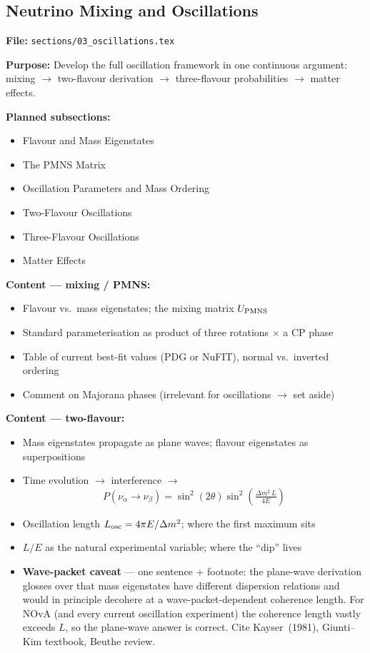 \documentclass[11pt]{article}
\begin{document}
\subsection{Neutrino Mixing and Oscillations}
\label{plan:oscillations}

\textbf{File:} \texttt{sections/03\_oscillations.tex}

\textbf{Purpose:} Develop the full oscillation framework in one continuous argument: mixing
$\to$ two-flavour derivation $\to$ three-flavour probabilities $\to$ matter effects.

\textbf{Planned subsections:}
\begin{itemize}
    \item Flavour and Mass Eigenstates
    \item The PMNS Matrix
    \item Oscillation Parameters and Mass Ordering
    \item Two-Flavour Oscillations
    \item Three-Flavour Oscillations
    \item Matter Effects
\end{itemize}

\textbf{Content --- mixing / PMNS:}
\begin{itemize}
    \item Flavour vs.\ mass eigenstates; the mixing matrix $U_{\rm PMNS}$
    \item Standard parameterisation as product of three rotations $\times$ a CP phase
    \item Table of current best-fit values (PDG or NuFIT), normal vs.\ inverted ordering
    \item Comment on Majorana phases (irrelevant for oscillations $\to$ set aside)
\end{itemize}

\textbf{Content --- two-flavour:}
\begin{itemize}
    \item Mass eigenstates propagate as plane waves; flavour eigenstates as superpositions
    \item Time evolution $\to$ interference $\to$
    \[
        P(\nu_\alpha \to \nu_\beta) = \sin^{2}(2\theta) \sin^{2}\!\left(
            \tfrac{\Delta m^{2}\,L}{4E}
        \right)
    \]
    \item Oscillation length $L_{\rm osc} = 4\pi E / \Delta m^{2}$; where the first maximum sits
    \item $L/E$ as the natural experimental variable; where the ``dip'' lives
    \item \textbf{Wave-packet caveat} --- one sentence + footnote: the plane-wave derivation
    glosses over that mass eigenstates have different dispersion relations and would in principle
    decohere at a wave-packet-dependent coherence length. For NOvA (and every current oscillation
    experiment) the coherence length vastly exceeds $L$, so the plane-wave answer is correct.
    Cite Kayser~(1981), Giunti--Kim textbook, Beuthe review.
\end{itemize}
\end{document}
